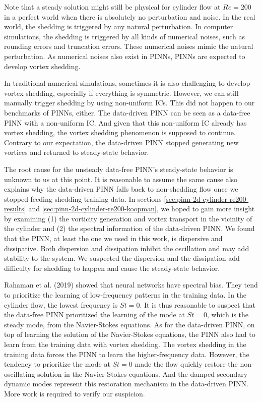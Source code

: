 
Note that a steady solution might still be physical for cylinder flow at $Re=200$ in a perfect world when there is absolutely no perturbation and noise.
In the real world, the shedding is triggered by any natural perturbation.
In computer simulations, the shedding is triggered by all kinds of numerical noises, such as rounding errors and truncation errors.
These numerical noises mimic the natural perturbation.
As numerical noises also exist in PINNs, PINNs are expected to develop vortex shedding.

In traditional numerical simulations, sometimes it is also challenging to develop vortex shedding, especially if everything is symmetric.
However, we can still manually trigger shedding by using non-uniform ICs.
This did not happen to our benchmarks of PINNs, either.
The data-driven PINN can be seen as a data-free PINN with a non-uniform IC.
And given that this non-uniform IC already has vortex shedding, the vortex shedding phenomenon is supposed to continue.
Contrary to our expectation, the data-driven PINN stopped generating new vortices and returned to steady-state behavior.

The root cause for the unsteady data-free PINN's steady-state behavior is unknown to us at this point.
It is reasonable to assume the same cause also explains why the data-driven PINN falls back to non-shedding flow once we stopped feeding shedding training data.
In sections \ref{sec:pinn-2d-cylinder-re200-results} and \ref{sec:pinn-2d-cylinder-re200-koopman}, we hoped to gain more insight by examining (1) the vorticity generation and vortex transport in the vicinity of the cylinder and (2) the spectral information of the data-driven PINN.
We found that the PINN, at least the one we used in this work, is dispersive and dissipative.
Both dispersion and dissipation inhibit the oscillation and may add stability to the system.
We suspected the dispersion and the dissipation add difficulty for shedding to happen and cause the steady-state behavior.

Rahaman et al. (2019) \cite{rahaman_spectral_2019} showed that neural networks have spectral bias.
They tend to prioritize the learning of low-frequency patterns in the training data.
In the cylinder flow, the lowest frequency is $St=0$.
It is thus reasonable to suspect that the data-free PINN prioritized the learning of the mode at $St=0$, which is the steady mode, from the Navier-Stokes equations.
As for the data-driven PINN, on top of learning the solution of the Navier-Stokes equations, the PINN also had to learn from the training data with vortex shedding.
The vortex shedding in the training data forces the PINN to learn the higher-frequency data.
However, the tendency to prioritize the mode at $St=0$ made the flow quickly restore the non-oscillating solution in the Navier-Stokes equations.
And the damped secondary dynamic modes represent this restoration mechanism in the data-driven PINN.
More work is required to verify our suspicion.

